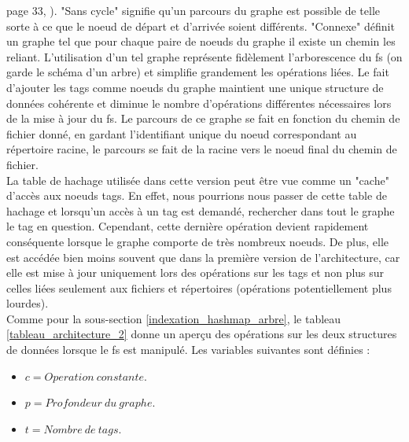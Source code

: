 \documentclass[a4paper, 12pt]{article}
\begin{document}
page 33, \cite{ref28}). "Sans cycle" signifie qu'un parcours du graphe est possible de telle sorte 
à ce que le noeud de départ et d'arrivée soient différents. "Connexe" définit un graphe tel que 
pour chaque paire de noeuds du graphe il existe un chemin les reliant. L'utilisation d'un tel 
graphe représente fidèlement l'arborescence du \acrshort{fs} (on garde le schéma d'un arbre) 
et simplifie grandement les opérations liées. Le fait d'ajouter les tags comme noeuds du graphe 
maintient une unique structure de données cohérente et diminue le nombre d'opérations différentes 
nécessaires lors de la mise à jour du \acrshort{fs}. Le parcours de ce graphe se fait en 
fonction du chemin de fichier donné, en gardant l'identifiant unique du noeud correspondant au 
répertoire racine, le parcours se fait de la racine vers le noeud final du chemin de fichier.
\\
La table de hachage utilisée dans cette version peut être vue comme un "cache" d'accès aux noeuds 
tags. En effet, nous pourrions nous passer de cette table de hachage et lorsqu'un accès à un tag 
est demandé, rechercher dans tout le graphe le tag en question. Cependant, cette dernière opération 
devient rapidement conséquente lorsque le graphe comporte de très nombreux noeuds. De plus, elle est 
accédée bien moins souvent que dans la première version de l'architecture, car elle est mise à jour 
uniquement lors des opérations sur les tags et non plus sur celles liées seulement aux fichiers et 
répertoires (opérations potentiellement plus lourdes).
\\
Comme pour la sous-section \ref{indexation_hashmap_arbre}, le tableau 
\ref{tableau_architecture_2} donne un aperçu des opérations sur les deux structures de données 
lorsque le \acrshort{fs} est manipulé. Les variables suivantes sont définies :
\begin{itemize}
    \item $c = Operation \ constante$.
    \item $p = Profondeur \ du \ graphe$.
    \item $t = Nombre \ de \ tags$.
\end{itemize}
\end{document}

